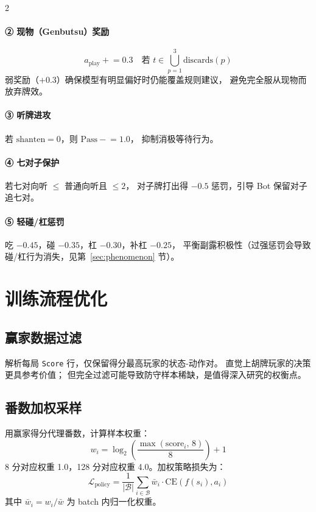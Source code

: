 \documentclass{article}
\newcommand{\calL}{\mathcal{L}}
\newcommand{\calB}{\mathcal{B}}
\begin{document}
\begin{multicols}{2}
\paragraph{② 现物（Genbutsu）奖励}
\begin{equation}
a_{\text{play}} \mathrel{+}= 0.3
\quad \text{若 } t \in \bigcup_{p=1}^{3}\text{discards}(p)
\label{eq:genbutsu}
\end{equation}
弱奖励（$+0.3$）确保模型有明显偏好时仍能覆盖规则建议，
避免完全服从现物而放弃牌效。

\paragraph{③ 听牌进攻}
若 $\text{shanten}=0$，则 $\text{Pass} \mathrel{-}= 1.0$，
抑制消极等待行为。

\paragraph{④ 七对子保护}
若七对向听 $\leq$ 普通向听且 $\leq 2$，
对子牌打出得 $-0.5$ 惩罚，引导 Bot 保留对子追七对。

\paragraph{⑤ 轻碰/杠惩罚}
吃 $-0.45$，碰 $-0.35$，杠 $-0.30$，补杠 $-0.25$，
平衡副露积极性（过强惩罚会导致碰/杠行为消失，见第~\ref{sec:phenomenon} 节）。

\section{训练流程优化}
\label{sec:training}

\subsection{赢家数据过滤}

解析每局 \texttt{Score} 行，仅保留得分最高玩家的状态-动作对。
直觉上胡牌玩家的决策更具参考价值；
但完全过滤可能导致防守样本稀缺，是值得深入研究的权衡点。

\subsection{番数加权采样}

用赢家得分代理番数，计算样本权重：
\begin{equation}
w_i = \log_2\!\left(\frac{\max(\text{score}_i,\,8)}{8}\right) + 1
\end{equation}
8 分对应权重 1.0，128 分对应权重 4.0。加权策略损失为：
\begin{equation}
\calL_{\text{policy}}
= \frac{1}{|\calB|}\sum_{i\in\calB} \bar{w}_i \cdot \text{CE}(f(s_i),a_i)
\label{eq:weighted_loss}
\end{equation}
其中 $\bar{w}_i = w_i / \bar{w}$ 为 batch 内归一化权重。


\end{multicols}
\end{document}
